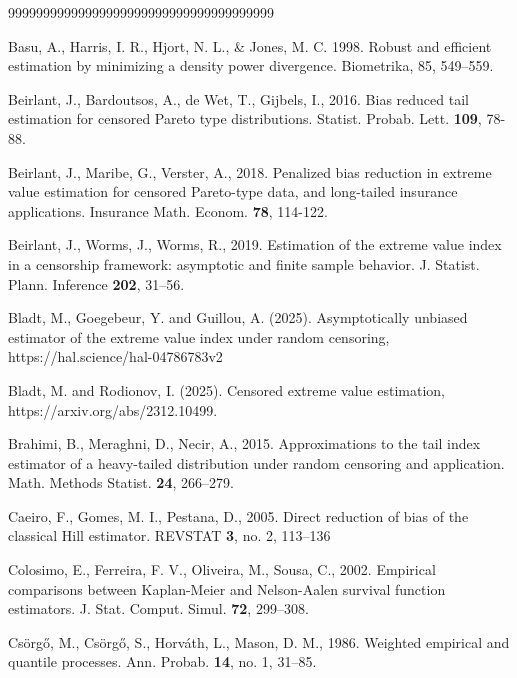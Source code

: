 \documentclass[reqno,openbib,runningheads,a4paper,12pt]{amsart}%
\begin{document}
\begin{thebibliography}{99999999999999999999999999999999999999}                                                           %


Basu, A., Harris, I. R., Hjort, N.
L., \& Jones, M. C. 1998. Robust and efficient estimation by minimizing a
density power divergence. Biometrika, 85, 549--559.

Beirlant, J., Bardoutsos,
A., de Wet, T., Gijbels, I., 2016. Bias reduced tail estimation for censored
Pareto type distributions. Statist. Probab. Lett. \textbf{109}, 78-88.

Beirlant, J., Maribe, G.,
Verster, A., 2018. Penalized bias reduction in extreme value estimation for
censored Pareto-type data, and long-tailed insurance applications. Insurance
Math. Econom. \textbf{78}, 114-122.

Beirlant, J., Worms, J.,
Worms, R., 2019. Estimation of the extreme value index in a censorship
framework: asymptotic and finite sample behavior. J. Statist. Plann. Inference
\textbf{202}, 31--56.

Bladt, M., Goegebeur, Y. and
Guillou, A. (2025). Asymptotically unbiased estimator of the extreme value
index under random censoring, https://hal.science/hal-04786783v2

Bladt, M. and Rodionov, I. (2025).
Censored extreme value estimation, https://arxiv.org/abs/2312.10499.

Brahimi, B.,
Meraghni, D., Necir, A., 2015. Approximations to the tail index estimator of a
heavy-tailed distribution under random censoring and application. Math.
Methods Statist. \textbf{24}, 266--279.

Caeiro, F., Gomes, M. I.,
Pestana, D., 2005. Direct reduction of bias of the classical Hill estimator.
REVSTAT \textbf{3}, no. 2, 113--136

Colosimo, E., Ferreira,
F. V., Oliveira, M., Sousa, C., 2002. Empirical comparisons between
Kaplan-Meier and Nelson-Aalen survival function estimators. J. Stat. Comput.
Simul. \textbf{72}, 299--308.

Cs\"{o}rg\H{o}, M.,
Cs\"{o}rg\H{o}, S., Horv\'{a}th, L., Mason, D. M., 1986. Weighted empirical
and quantile processes. Ann. Probab. \textbf{14}, no. 1, 31--85.


\end{thebibliography}
\end{document}
